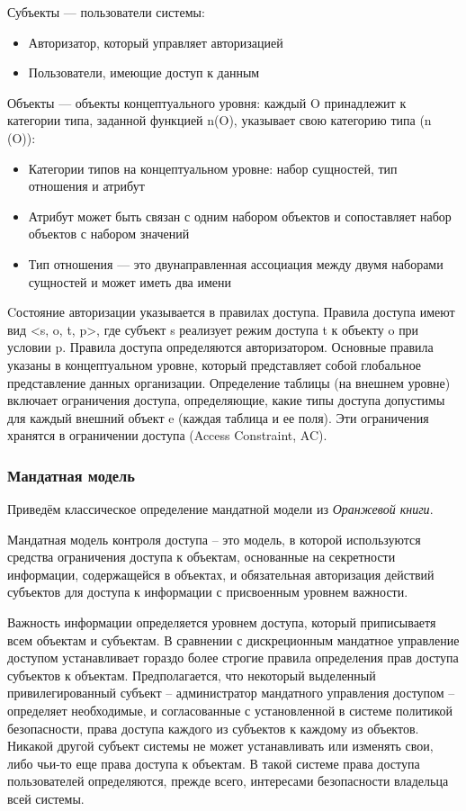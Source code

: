 Субъекты --- пользователи системы:
\begin{itemize}
    \item Авторизатор, который управляет авторизацией
    \item Пользователи, имеющие доступ к данным
\end{itemize}

Объекты --- объекты концептуального уровня: каждый O принадлежит к категории типа, заданной функцией n(O),
указывает свою категорию типа (n (O)):
\begin{itemize}
    \item Категории типов на концептуальном уровне: набор сущностей, тип отношения и атрибут
    \item Атрибут может быть связан с одним набором объектов и сопоставляет набор объектов с набором значений
    \item Тип отношения --- это двунаправленная ассоциация между двумя наборами сущностей и может иметь два имени
\end{itemize}

Cостояние авторизации указывается в правилах доступа. Правила доступа имеют вид <s, o, t, p>, где субъект s
реализует режим доступа t к объекту o при условии p. Правила доступа определяются авторизатором. Основные правила
указаны в концептуальном уровне, который представляет собой глобальное представление данных организации. Определение
таблицы (на внешнем уровне) включает ограничения доступа, определяющие, какие типы доступа допустимы для
каждый внешний объект e (каждая таблица и ее поля). Эти ограничения хранятся в ограничении доступа (Access Constraint, AC).

\subsubsection{Мандатная модель}

Приведём классическое определение мандатной модели из \textit{Оранжевой книги}.

\begin{grayquote}
Мандатная модель контроля доступа – это модель, в которой используются средства ограничения доступа к объектам,  основанные на секретности информации,  содержащейся в объектах, и обязательная авторизация действий субъектов для доступа к информации с присвоенным уровнем важности.
\end{grayquote}

Важность информации определяется уровнем доступа,  который приписываетя всем объектам и субъектам.  В сравнении с дискреционным мандатное управление доступом устанавливает гораздо более строгие правила определения прав доступа субъектов к объектам. Предполагается, что некоторый выделенный привилегированный субъект – администратор мандатного управления доступом – определяет необходимые, и согласованные с установленной в системе политикой безопасности, права доступа каждого из субъектов к каждому из объектов. Никакой другой субъект системы не может устанавливать или изменять свои, либо чьи-то еще права доступа к объектам. В такой системе права доступа пользователей определяются, прежде всего, интересами безопасности владельца всей системы.

